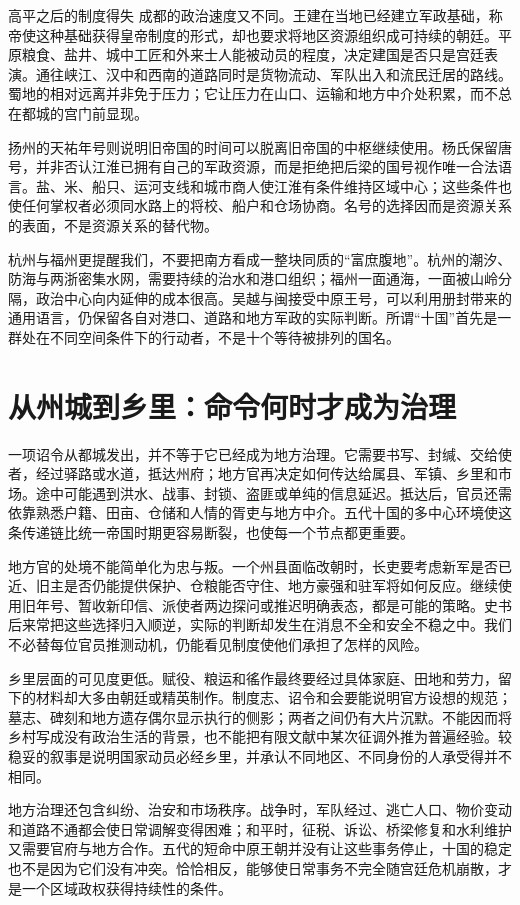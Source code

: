 \begin{causalchain}{高平之后的制度得失}
成都的政治速度又不同。王建在当地已经建立军政基础，称帝使这种基础获得皇帝制度的形式，却也要求将地区资源组织成可持续的朝廷。平原粮食、盐井、城中工匠和外来士人能被动员的程度，决定建国是否只是宫廷表演。通往峡江、汉中和西南的道路同时是货物流动、军队出入和流民迁居的路线。蜀地的相对远离并非免于压力；它让压力在山口、运输和地方中介处积累，而不总在都城的宫门前显现。

扬州的天祐年号则说明旧帝国的时间可以脱离旧帝国的中枢继续使用。杨氏保留唐号，并非否认江淮已拥有自己的军政资源，而是拒绝把后梁的国号视作唯一合法语言。盐、米、船只、运河支线和城市商人使江淮有条件维持区域中心；这些条件也使任何掌权者必须同水路上的将校、船户和仓场协商。名号的选择因而是资源关系的表面，不是资源关系的替代物。

杭州与福州更提醒我们，不要把南方看成一整块同质的“富庶腹地”。杭州的潮汐、防海与两浙密集水网，需要持续的治水和港口组织；福州一面通海，一面被山岭分隔，政治中心向内延伸的成本很高。吴越与闽接受中原王号，可以利用册封带来的通用语言，仍保留各自对港口、道路和地方军政的实际判断。所谓“十国”首先是一群处在不同空间条件下的行动者，不是十个等待被排列的国名。

\section{从州城到乡里：命令何时才成为治理}

一项诏令从都城发出，并不等于它已经成为地方治理。它需要书写、封缄、交给使者，经过驿路或水道，抵达州府；地方官再决定如何传达给属县、军镇、乡里和市场。途中可能遇到洪水、战事、封锁、盗匪或单纯的信息延迟。抵达后，官员还需依靠熟悉户籍、田亩、仓储和人情的胥吏与地方中介。五代十国的多中心环境使这条传递链比统一帝国时期更容易断裂，也使每一个节点都更重要。

地方官的处境不能简单化为忠与叛。一个州县面临改朝时，长吏要考虑新军是否已近、旧主是否仍能提供保护、仓粮能否守住、地方豪强和驻军将如何反应。继续使用旧年号、暂收新印信、派使者两边探问或推迟明确表态，都是可能的策略。史书后来常把这些选择归入顺逆，实际的判断却发生在消息不全和安全不稳之中。我们不必替每位官员推测动机，仍能看见制度使他们承担了怎样的风险。

乡里层面的可见度更低。赋役、粮运和徭作最终要经过具体家庭、田地和劳力，留下的材料却大多由朝廷或精英制作。制度志、诏令和会要能说明官方设想的规范；墓志、碑刻和地方遗存偶尔显示执行的侧影；两者之间仍有大片沉默。不能因而将乡村写成没有政治生活的背景，也不能把有限文献中某次征调外推为普遍经验。较稳妥的叙事是说明国家动员必经乡里，并承认不同地区、不同身份的人承受得并不相同。

地方治理还包含纠纷、治安和市场秩序。战争时，军队经过、逃亡人口、物价变动和道路不通都会使日常调解变得困难；和平时，征税、诉讼、桥梁修复和水利维护又需要官府与地方合作。五代的短命中原王朝并没有让这些事务停止，十国的稳定也不是因为它们没有冲突。恰恰相反，能够使日常事务不完全随宫廷危机崩散，才是一个区域政权获得持续性的条件。


\end{causalchain}
